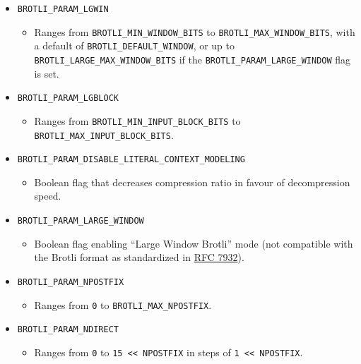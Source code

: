 \begin{itemize}
\tightlist
\item
  \texttt{BROTLI\_PARAM\_LGWIN}

  \begin{itemize}
  \tightlist
  \item
    Ranges from \texttt{BROTLI\_MIN\_WINDOW\_BITS} to
    \texttt{BROTLI\_MAX\_WINDOW\_BITS}, with a default of
    \texttt{BROTLI\_DEFAULT\_WINDOW}, or up to
    \texttt{BROTLI\_LARGE\_MAX\_WINDOW\_BITS} if the
    \texttt{BROTLI\_PARAM\_LARGE\_WINDOW} flag is set.
  \end{itemize}
\item
  \texttt{BROTLI\_PARAM\_LGBLOCK}

  \begin{itemize}
  \tightlist
  \item
    Ranges from \texttt{BROTLI\_MIN\_INPUT\_BLOCK\_BITS} to
    \texttt{BROTLI\_MAX\_INPUT\_BLOCK\_BITS}.
  \end{itemize}
\item
  \texttt{BROTLI\_PARAM\_DISABLE\_LITERAL\_CONTEXT\_MODELING}

  \begin{itemize}
  \tightlist
  \item
    Boolean flag that decreases compression ratio in favour of
    decompression speed.
  \end{itemize}
\item
  \texttt{BROTLI\_PARAM\_LARGE\_WINDOW}

  \begin{itemize}
  \tightlist
  \item
    Boolean flag enabling ``Large Window Brotli'' mode (not compatible
    with the Brotli format as standardized in
    \href{https://www.rfc-editor.org/rfc/rfc7932.txt}{RFC 7932}).
  \end{itemize}
\item
  \texttt{BROTLI\_PARAM\_NPOSTFIX}

  \begin{itemize}
  \tightlist
  \item
    Ranges from \texttt{0} to \texttt{BROTLI\_MAX\_NPOSTFIX}.
  \end{itemize}
\item
  \texttt{BROTLI\_PARAM\_NDIRECT}

  \begin{itemize}
  \tightlist
  \item
    Ranges from \texttt{0} to
    \texttt{15\ \textless{}\textless{}\ NPOSTFIX} in steps of
    \texttt{1\ \textless{}\textless{}\ NPOSTFIX}.
  \end{itemize}
\end{itemize}

